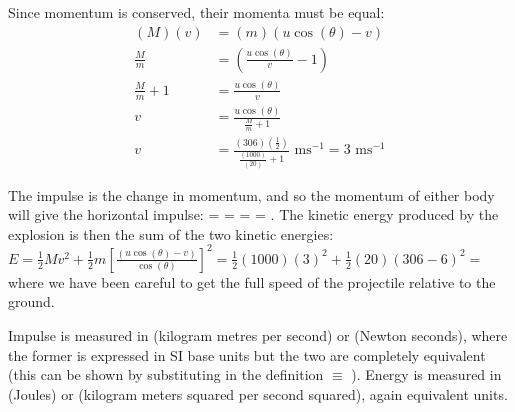 \begin{problem}[A1972AMIIQ2l]
{Since momentum is conserved, their momenta must be equal:
\begin{align*} 
(M)(v) &= (m)(u \cos (\theta) - v) \\  
\frac{M}{m} &= \left( \frac{u \cos(\theta)}{v} - 1 \right) \\  
\frac{M}{m} + 1 &= \frac{u \cos(\theta)}{v} \\ 
v &= \frac{u \cos(\theta)}{\frac{M}{m} + 1} \\ 
v &= \frac{(306)(\frac{1}{2})}{\frac{(1000)}{(20)} + 1} \text{ ms}^{-1} = 3 \text{ ms}^{-1}
 \end{align*}

The impulse is the change in momentum, and so the momentum of either body will give the horizontal impulse:  =  =  =  = .
The kinetic energy produced by the explosion is then the sum of the two kinetic energies: $E = \frac{1}{2}Mv^{2} + \frac{1}{2}m\left[\frac{(u \cos(\theta) - v)}{\cos(\theta)}\right]^{2} = \frac{1}{2}(1000)(3)^{2} + \frac{1}{2}(20)(306 - 6)^{2} =$  where we have been careful to get the full speed of the projectile relative to the ground.

Impulse is measured in  (kilogram metres per second) or  (Newton seconds), where the former is expressed in SI base units but the two are completely equivalent (this can be shown by substituting in the definition  $\equiv$ ). Energy is measured in  (Joules) or  (kilogram meters squared per second squared), again equivalent units.}


\end{problem}
